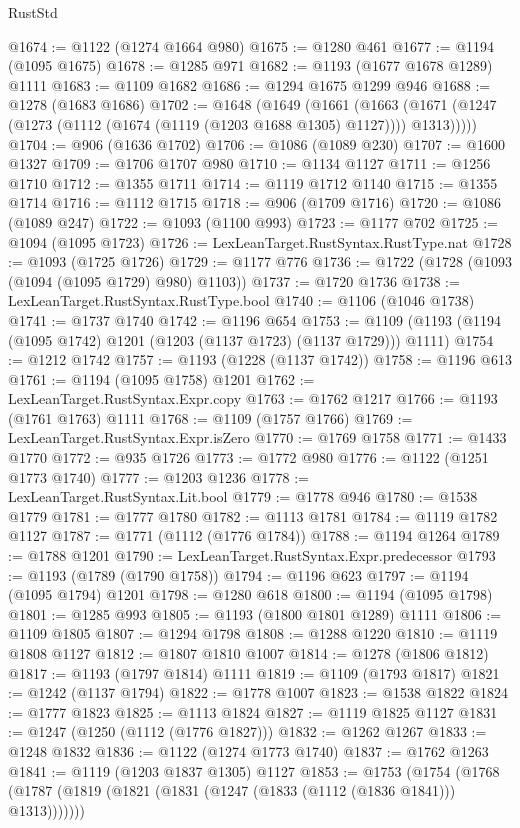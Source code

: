 \begin{lexlean}{RustStd}
\begin{coremodule}
@1674 := @1122 (@1274 @1664 @980)
@1675 := @1280 @461
@1677 := @1194 (@1095 @1675)
@1678 := @1285 @971
@1682 := @1193 (@1677 @1678 @1289) @1111
@1683 := @1109 @1682
@1686 := @1294 @1675 @1299 @946
@1688 := @1278 (@1683 @1686)
@1702 := @1648
    (@1649
      (@1661
        (@1663 (@1671 (@1247 (@1273 (@1112 (@1674 (@1119 (@1203 @1688 @1305) @1127)))) @1313)))))
@1704 := @906 (@1636 @1702)
@1706 := @1086 (@1089 @230)
@1707 := @1600 @1327
@1709 := @1706 @1707 @980
@1710 := @1134 @1127
@1711 := @1256 @1710
@1712 := @1355 @1711
@1714 := @1119 @1712 @1140
@1715 := @1355 @1714
@1716 := @1112 @1715
@1718 := @906 (@1709 @1716)
@1720 := @1086 (@1089 @247)
@1722 := @1093 (@1100 @993)
@1723 := @1177 @702
@1725 := @1094 (@1095 @1723)
@1726 := LexLeanTarget.RustSyntax.RustType.nat
@1728 := @1093 (@1725 @1726)
@1729 := @1177 @776
@1736 := @1722 (@1728 (@1093 (@1094 (@1095 @1729) @980) @1103))
@1737 := @1720 @1736
@1738 := LexLeanTarget.RustSyntax.RustType.bool
@1740 := @1106 (@1046 @1738)
@1741 := @1737 @1740
@1742 := @1196 @654
@1753 := @1109 (@1193 (@1194 (@1095 @1742) @1201 (@1203 (@1137 @1723) (@1137 @1729))) @1111)
@1754 := @1212 @1742
@1757 := @1193 (@1228 (@1137 @1742))
@1758 := @1196 @613
@1761 := @1194 (@1095 @1758) @1201
@1762 := LexLeanTarget.RustSyntax.Expr.copy
@1763 := @1762 @1217
@1766 := @1193 (@1761 @1763) @1111
@1768 := @1109 (@1757 @1766)
@1769 := LexLeanTarget.RustSyntax.Expr.isZero
@1770 := @1769 @1758
@1771 := @1433 @1770
@1772 := @935 @1726
@1773 := @1772 @980
@1776 := @1122 (@1251 @1773 @1740)
@1777 := @1203 @1236
@1778 := LexLeanTarget.RustSyntax.Lit.bool
@1779 := @1778 @946
@1780 := @1538 @1779
@1781 := @1777 @1780
@1782 := @1113 @1781
@1784 := @1119 @1782 @1127
@1787 := @1771 (@1112 (@1776 @1784))
@1788 := @1194 @1264
@1789 := @1788 @1201
@1790 := LexLeanTarget.RustSyntax.Expr.predecessor
@1793 := @1193 (@1789 (@1790 @1758))
@1794 := @1196 @623
@1797 := @1194 (@1095 @1794) @1201
@1798 := @1280 @618
@1800 := @1194 (@1095 @1798)
@1801 := @1285 @993
@1805 := @1193 (@1800 @1801 @1289) @1111
@1806 := @1109 @1805
@1807 := @1294 @1798
@1808 := @1288 @1220
@1810 := @1119 @1808 @1127
@1812 := @1807 @1810 @1007
@1814 := @1278 (@1806 @1812)
@1817 := @1193 (@1797 @1814) @1111
@1819 := @1109 (@1793 @1817)
@1821 := @1242 (@1137 @1794)
@1822 := @1778 @1007
@1823 := @1538 @1822
@1824 := @1777 @1823
@1825 := @1113 @1824
@1827 := @1119 @1825 @1127
@1831 := @1247 (@1250 (@1112 (@1776 @1827)))
@1832 := @1262 @1267
@1833 := @1248 @1832
@1836 := @1122 (@1274 @1773 @1740)
@1837 := @1762 @1263
@1841 := @1119 (@1203 @1837 @1305) @1127
@1853 := @1753
    (@1754 (@1768 (@1787 (@1819 (@1821 (@1831 (@1247 (@1833 (@1112 (@1836 @1841))) @1313)))))))

\end{coremodule}
\end{lexlean}
